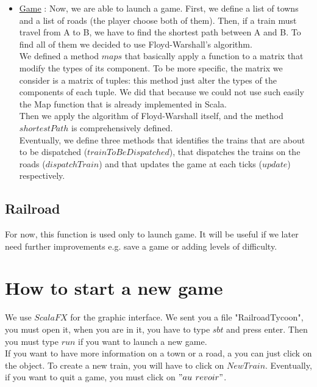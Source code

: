 \documentclass[a4paper]{article}
\begin{document}
\begin{itemize}
		\item \underline{Game} : Now, we are able to launch a game. First, we define a list of towns and a list of roads (the player choose both of them). Then, if a train must travel from A to B, we have to find the shortest path between A and B. To find all of them we decided to use Floyd-Warshall's algorithm. \\
		We defined a method $maps$ that basically apply a function to a matrix that modify the types of its component. To be more specific, the matrix we consider is a matrix of tuples: this method just alter the types of the components of each tuple. We did that because we could not use such easily the Map function that is already implemented in Scala. \\
		Then we apply the algorithm of Floyd-Warshall itself, and the method $shortestPath$ is comprehensively defined.\\
		Eventually, we define three methods that identifies the trains that are about to be dispatched ($trainToBeDispatched$), that dispatches the trains on the roads ($dispatchTrain$) and that updates the game at each ticks ($update$) respectively. 
		
		
		
		
	\end{itemize}
	\subsection{Railroad}
	For now, this function is used only to launch game. It will be useful if we later need further improvements e.g. save a game or adding levels of difficulty.
	\section{How to start a new game}
	
	We use $ScalaFX$ for the graphic interface. We sent you a file "RailroadTycoon", you must open it, when you are in it, you have to type $sbt$ and press enter. Then you must type $run$ if you want to launch a new game.\\
	If you want to have more information on a town or a road, a you can just click on the object.
	To create a new train, you will have to click on $New Train$. Eventually, if you want to quit a game, you must click on $"au$ $revoir"$.
		
\end{document}
